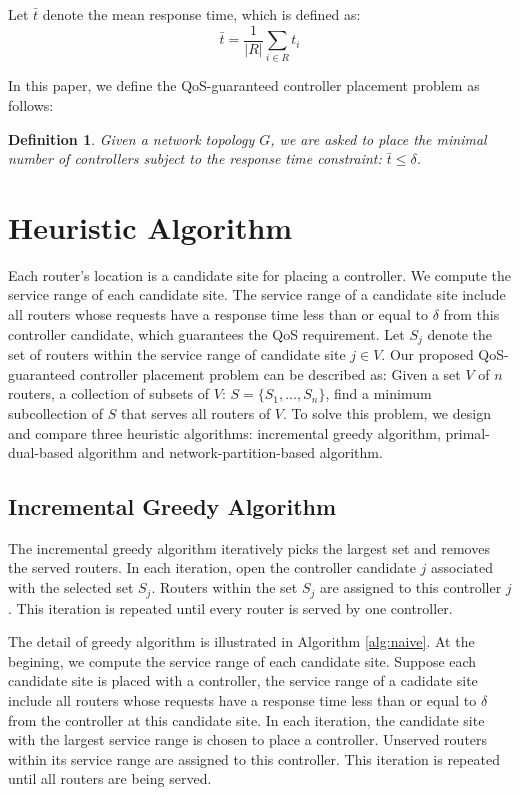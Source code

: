 \documentclass[conference]{IEEEtran}
\newtheorem{definition}{Definition}
\begin{document}
Let $\bar{t}$ denote the mean response time, which is defined as:
\begin{equation}
\bar{t}=\frac{1}{|R|}\sum_{i\in R}t_i
\end{equation}

In this paper, we define the QoS-guaranteed controller placement problem as follows:
\begin{definition}
Given a network topology $G$, we are asked to place the minimal number of controllers subject to the response time constraint: $\bar{t}\leq \delta$. 
\end{definition}

\section{Heuristic Algorithm}
\label{sec:solution}

Each router's location is a candidate site for placing a controller. We compute the service range of each candidate site. The service range of a candidate site include all routers whose requests have a response time less than or equal to $\delta$ from this controller candidate, which guarantees the QoS requirement. Let $S_j$ denote the set of routers within the service range of candidate site $j\in V$. Our proposed QoS-guaranteed controller placement problem can be described as: Given a set $V$ of $n$ routers, a collection of subsets of $V$: $S=\{S_1, ..., S_n\}$, find a minimum subcollection of $S$ that serves all routers of $V$. To solve this problem, we design and compare three heuristic algorithms: incremental greedy algorithm, primal-dual-based algorithm and network-partition-based algorithm.


\subsection{Incremental Greedy Algorithm}
The incremental greedy algorithm iteratively picks the largest set and removes the served routers. In each iteration, open the controller candidate $j$ associated with the selected set $S_j$. Routers within the set $S_j$ are assigned to this controller $j$. This iteration is repeated until every router is served by one controller.   

The detail of greedy algorithm is illustrated in Algorithm \ref{alg:naive}. At the begining, we compute the service range of each candidate site. Suppose each candidate site is placed with a controller, the service range of a cadidate site include all routers whose requests have a response time less than or equal to $\delta$ from the controller at this candidate site. In each iteration, the candidate site with the largest service range is chosen to place a controller. Unserved routers within its service range are assigned to this controller. This iteration is repeated until all routers are being served. 
\end{document}
